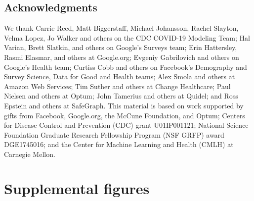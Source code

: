 \documentclass[11pt]{article}
\begin{document}
\subsection*{Acknowledgments}

We thank Carrie Reed, Matt Biggerstaff, Michael Johansson, Rachel Slayton, Velma
Lopez, Jo Walker and others on the CDC COVID-19 Modeling Team; Hal Varian, Brett
Slatkin, and others on Google's Surveys team; Erin Hattersley, Rasmi Elasmar,
and others at Google.org; Evgeniy Gabrilovich and others on Google's Health
team; Curtiss Cobb and others on Facebook's Demography and Survey Science, Data
for Good and Health teams; Alex Smola and others at Amazon Web Services; Tim
Suther and others at Change Healthcare; Paul Nielsen and others at Optum; John
Tamerius and others at Quidel; and Ross Epstein and others at SafeGraph. This
material is based on work supported by gifts from Facebook, Google.org, the
McCune Foundation, and Optum; Centers for Disease Control and Prevention (CDC)
grant U01IP001121; National Science Foundation Graduate Research Fellowship
Program (NSF GRFP) award DGE1745016; and the Center for Machine Learning and
Health (CMLH) at Carnegie Mellon.





\clearpage

\appendix

\section*{Supplemental figures}

\clearpage


\end{document}
